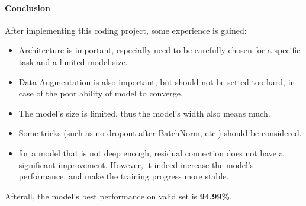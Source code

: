 \documentclass[a4 paper,12pt]{article}
\theoremstyle{definitionstyle}
\begin{document}
\paragraph{Conclusion}
After implementing this coding project, some experience is gained:
\begin{itemize}
    \item Architecture is important, especially need to be carefully chosen for a specific task and a limited model size.
    \item Data Augmentation is also important, but should not be setted too hard, in case of the poor ability of model to converge.
    \item The model's size is limited, thus the model's width also means much.
    \item Some tricks (such as no dropout after BatchNorm, etc.) should be considered.
    \item for a model that is not deep enough, residual connection does not have a significant improvement. However, it indeed increase the model's performance, and make the training progress more stable.
\end{itemize}
Afterall, the model's best performance on valid set is \textbf{94.99\%}.
\end{document}
